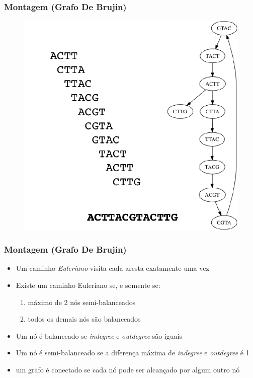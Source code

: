 \documentclass{beamer}
\begin{document}
		\begin{frame}\frametitle{Montagem (Grafo De Brujin)}
		\begin{figure}[ht]
			\centering
			\includegraphics[width=.6\textwidth]{img/dbrujin.png}
		\end{figure}
		\end{frame}
	
		\begin{frame}\frametitle{Montagem (Grafo De Brujin)}
		\begin{itemize}
			\item Um caminho \textit{Euleriano} visita cada aresta exatamente uma vez
			\item Existe um caminho Euleriano se, e somente se:
			\begin{enumerate}
				\item máximo de 2 nós semi-balanceados
				\item todos os demais nós são balanceados
			\end{enumerate}
			\item Um nó é balanceado se \textit{indegree} e \textit{outdegree} são iguais
			\item Um nó é semi-balanceado se a diferença máxima de \textit{indegree} e \textit{outdegree} é 1
			\item um grafo é conectado se cada nó pode ser alcançado por algum outro nó		
		\end{itemize}
		\end{frame}
	
\end{document}
